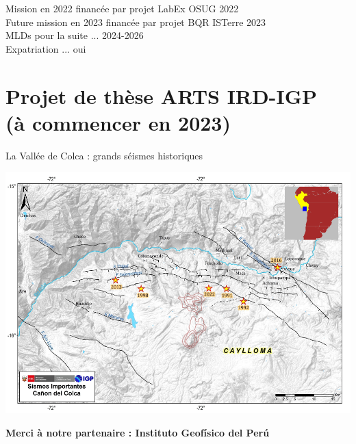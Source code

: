 \documentclass{beamer}
\begin{document}
\begin{frame}
\begin{center}
\begin{minipage}{0.3\linewidth}
  \end{minipage}
 \end{center}
 {\small
 Mission en 2022 financée par projet LabEx OSUG 2022 \\
 Future mission en 2023 financée par projet BQR ISTerre 2023 \\
 MLDs pour la suite ... 2024-2026 \\
 Expatriation ... oui
 }
 
 
\end{frame}




\section{Projet de thèse ARTS IRD-IGP \\ (à commencer en 2023)}

\begin{frame}
 {La Vallée de Colca : grands séismes historiques}

 \begin{center}
 \vskip -0.5cm  \includegraphics[width=0.9\linewidth]{images/red_colca_hist.png}  \\  
 \end{center}

 \hfill {\bf \small Merci à notre partenaire : Instituto Geofísico del Perú}

\end{frame}
\end{document}
